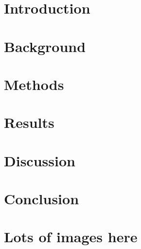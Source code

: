 \documentclass{kththesis}
\begin{document}
\chapter{Introduction}



\chapter{Background}


\chapter{Methods}





\chapter{Results}


\chapter{Discussion}


\chapter{Conclusion}



\printbibliography[heading=bibintoc] %

\appendix

\chapter{Lots of images here}
\end{document}
